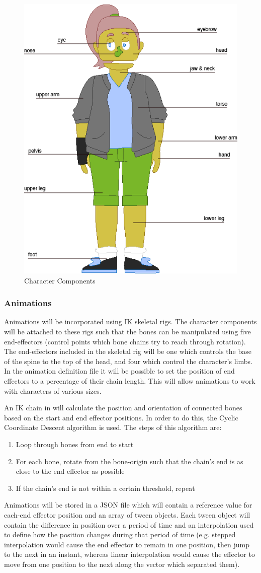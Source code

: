 \begin{figure}[H]
\centering\includegraphics[width=.4\linewidth]{images/character_components}
\caption{Character Components}
\label{fig:character_components}
\end{figure}

\subsubsection{Animations}
Animations will be incorporated using IK skeletal rigs. The character components will be attached to these rigs such that the bones can be manipulated using five end-effectors (control points which bone chains try to reach through rotation). The end-effectors included in the skeletal rig will be one which controls the base of the spine to the top of the head, and four which control the character's limbs. In the animation definition file it will be possible to set the position of end effectors to a percentage of their chain length. This will allow animations to work with characters of various sizes.

An IK chain in \ourgame{} will calculate the position and orientation of connected bones based on the start and end effector positions. In order to do this, the Cyclic Coordinate Descent algorithm is used. The steps of this algorithm are:
\begin{enumerate}
\item{Loop through bones from end to start}
\item{For each bone, rotate from the bone-origin such that the chain's end is as close to the end effector as possible}
\item{If the chain's end is not within a certain threshold, repeat}
\end{enumerate}

Animations will be stored in a JSON file which will contain a reference value for each-end effector position and an array of tween objects. Each tween object will contain the difference in position over a period of time and an interpolation used to define how the position changes during that period of time (e.g. stepped interpolation would cause the end effector to remain in one position, then jump to the next in an instant, whereas linear interpolation would cause the effector to move from one position to the next along the vector which separated them).

